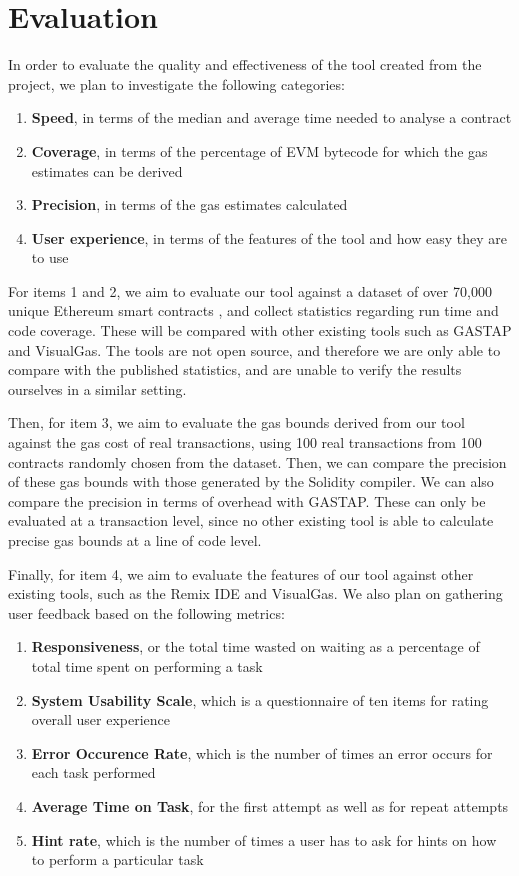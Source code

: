 \chapter{Evaluation}
\label{chap:eval}

In order to evaluate the quality and effectiveness of the tool created from the project, we plan 
to investigate the following categories:

\begin{enumerate}
  \item \textbf{Speed}, in terms of the median and average time needed to analyse a contract
  \item \textbf{Coverage}, in terms of the percentage of EVM bytecode for which the gas estimates can be derived
  \item \textbf{Precision}, in terms of the gas estimates calculated
  \item \textbf{User experience}, in terms of the features of the tool and how easy they are to use
\end{enumerate}

For items 1 and 2, we aim to evaluate our tool against a dataset of over 70,000 unique Ethereum smart
contracts \cite{smart_contract_sanctuary}, and collect statistics regarding run time and code coverage.
These will be compared with other existing tools such as GASTAP and VisualGas. The tools are not
open source, and therefore we are only able to compare with the published statistics, and are
unable to verify the results ourselves in a similar setting.

Then, for item 3, we aim to evaluate the gas bounds derived from our tool against the gas cost of real
transactions, using 100 real transactions from 100 contracts randomly chosen from the dataset.
Then, we can compare the precision of these gas bounds with those generated by the Solidity compiler.
We can also compare the precision in terms of overhead with GASTAP. These can only be evaluated at a transaction
level, since no other existing tool is able to calculate precise gas bounds at a line of code level.

Finally, for item 4, we aim to evaluate the features of our tool against other existing tools, such
as the Remix IDE and VisualGas. We also plan on gathering user feedback based on the following 
metrics:
\begin{enumerate}
  \item \textbf{Responsiveness}, or the total time wasted on waiting as a percentage of total time spent on performing a task
  \item \textbf{System Usability Scale}, which is a questionnaire of ten items for rating overall user experience
  \item \textbf{Error Occurence Rate}, which is the number of times an error occurs for each task performed
  \item \textbf{Average Time on Task}, for the first attempt as well as for repeat attempts
  \item \textbf{Hint rate}, which is the number of times a user has to ask for hints on how to perform a particular task
\end{enumerate}

